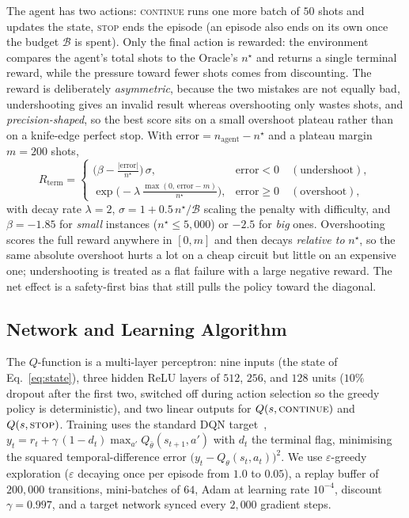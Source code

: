 \documentclass[runningheads]{llncs}
\begin{document}
The agent has two actions: \textsc{continue} runs one more batch of $50$ shots
and updates the state, \textsc{stop} ends the episode (an episode also ends on
its own once the budget $\mathcal{B}$ is spent). Only the final action is
rewarded: the environment compares the agent's total shots to the Oracle's
$n^{\star}$ and returns a single terminal reward, while the pressure toward
fewer shots comes from discounting. The reward is deliberately \emph{asymmetric},
because the two mistakes are not equally bad, undershooting gives an invalid
result whereas overshooting only wastes shots, and \emph{precision-shaped}, so
the best score sits on a small overshoot plateau rather than on a knife-edge
perfect stop. With $\text{error} = n_{\text{agent}} - n^{\star}$ and a plateau
margin $m = 200$ shots,
\begin{equation}
  R_{\text{term}} =
  \begin{cases}
    \bigl(\beta - \tfrac{|\text{error}|}{n^{\star}}\bigr)\,\sigma,
      & \text{error} < 0 \quad (\text{undershoot}),\\[4pt]
    \exp\!\bigl(-\lambda\,\tfrac{\max(0,\,\text{error}-m)}{n^{\star}}\bigr),
      & \text{error} \ge 0 \quad (\text{overshoot}),
  \end{cases}
  \label{eq:reward}
\end{equation}
with decay rate $\lambda = 2$, $\sigma = 1 + 0.5\,n^{\star}/\mathcal{B}$ scaling
the penalty with difficulty, and $\beta = -1.85$ for \emph{small} instances
($n^{\star} \le 5{,}000$) or $-2.5$ for \emph{big} ones. Overshooting scores the
full reward anywhere in $[0,m]$ and then decays \emph{relative to} $n^{\star}$, so
the same absolute overshoot hurts a lot on a cheap circuit but little on an
expensive one; undershooting is treated as a flat failure with a large negative
reward. The net effect is a safety-first bias that still pulls the policy toward
the diagonal.

\subsection{Network and Learning Algorithm}

The $Q$-function is a multi-layer perceptron: nine inputs (the state of
Eq.~\eqref{eq:state}), three hidden ReLU layers of $512$, $256$, and $128$ units
($10\%$ dropout after the first two, switched off during action selection so the
greedy policy is deterministic), and two linear outputs for
$Q(s,\textsc{continue})$ and $Q(s,\textsc{stop})$. Training uses the standard DQN
target~\cite{mnih2015human},
$y_t = r_t + \gamma\,(1-d_t)\max_{a'}Q_{\bar\theta}(s_{t+1},a')$ with $d_t$ the
terminal flag, minimising the squared temporal-difference error
$\bigl(y_t - Q_\theta(s_t,a_t)\bigr)^2$. We use $\varepsilon$-greedy exploration
($\varepsilon$ decaying once per episode from $1.0$ to $0.05$), a replay buffer of
$200{,}000$ transitions, mini-batches of $64$, Adam at learning rate $10^{-4}$,
discount $\gamma = 0.997$, and a target network synced every $2{,}000$ gradient
steps.
\end{document}
